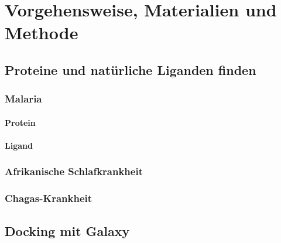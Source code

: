 \documentclass[11pt]{article}
\begin{document}
    \section{Vorgehensweise, Materialien und Methode}\label{sec:vorgehensweise-materialien-und-methode}

    \subsection{Proteine und natürliche Liganden finden}\label{subsec:proteine-und-natuerliche-liganden-finden}


    \subsubsection{Malaria}\label{subsubsec:malaria}

    \paragraph{Protein}

    \paragraph{Ligand}

    \subsubsection{Afrikanische Schlafkrankheit}\label{subsubsec:afrikanische-schlafkrankheit}

    \subsubsection{Chagas-Krankheit}\label{subsubsec:chagas-krankheit}

    \subsection{Docking mit Galaxy}\label{subsec:galaxy}

%
%
%
\end{document}
